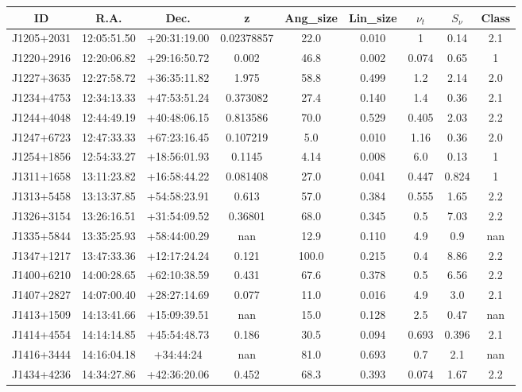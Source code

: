 \begin{table}[H]
    \centering
    \begin{tabular}{@{}ccccccccc@{}}
        \toprule
        ID & R.A. & Dec. & z & Ang\_size & Lin\_size & $\nu_t$ & $S_\nu$ & Class \\ \midrule
        J1205+2031 & 12:05:51.50 & +20:31:19.00 & 0.02378857 & 22.0 & 0.010 & 1 & 0.14 & 2.1 \\
        J1220+2916 & 12:20:06.82 & +29:16:50.72 & 0.002 & 46.8 & 0.002 & 0.074 & 0.65 & 1 \\
        J1227+3635 & 12:27:58.72 & +36:35:11.82 & 1.975 & 58.8 & 0.499 & 1.2 & 2.14 & 2.0 \\
        J1234+4753 & 12:34:13.33 & +47:53:51.24 & 0.373082 & 27.4 & 0.140 & 1.4 & 0.36 & 2.1 \\
        J1244+4048 & 12:44:49.19 & +40:48:06.15 & 0.813586 & 70.0 & 0.529 & 0.405 & 2.03 & 2.2 \\
        J1247+6723 & 12:47:33.33 & +67:23:16.45 & 0.107219 & 5.0 & 0.010 & 1.16 & 0.36 & 2.0 \\
        J1254+1856 & 12:54:33.27 & +18:56:01.93 & 0.1145 & 4.14 & 0.008 & 6.0 & 0.13 & 1 \\
        J1311+1658 & 13:11:23.82 & +16:58:44.22 & 0.081408 & 27.0 & 0.041 & 0.447 & 0.824 & 1 \\
        J1313+5458 & 13:13:37.85 & +54:58:23.91 & 0.613 & 57.0 & 0.384 & 0.555 & 1.65 & 2.2 \\
        J1326+3154 & 13:26:16.51 & +31:54:09.52 & 0.36801 & 68.0 & 0.345 & 0.5 & 7.03 & 2.2 \\
        J1335+5844 & 13:35:25.93 & +58:44:00.29 & nan & 12.9 & 0.110 & 4.9 & 0.9 & nan \\
        J1347+1217 & 13:47:33.36 & +12:17:24.24 & 0.121 & 100.0 & 0.215 & 0.4 & 8.86 & 2.2 \\
        J1400+6210 & 14:00:28.65 & +62:10:38.59 & 0.431 & 67.6 & 0.378 & 0.5 & 6.56 & 2.2 \\
        J1407+2827 & 14:07:00.40 & +28:27:14.69 & 0.077 & 11.0 & 0.016 & 4.9 & 3.0 & 2.1 \\
        J1413+1509 & 14:13:41.66 & +15:09:39.51 & nan & 15.0 & 0.128 & 2.5 & 0.47 & nan \\
        J1414+4554 & 14:14:14.85 & +45:54:48.73 & 0.186 & 30.5 & 0.094 & 0.693 & 0.396 & 2.1 \\
        J1416+3444 & 14:16:04.18 & +34:44:24 & nan & 81.0 & 0.693 & 0.7 & 2.1 & nan \\
        J1434+4236 & 14:34:27.86 & +42:36:20.06 & 0.452 & 68.3 & 0.393 & 0.074 & 1.67 & 2.2 \\

\end{tabular}
\end{table}
